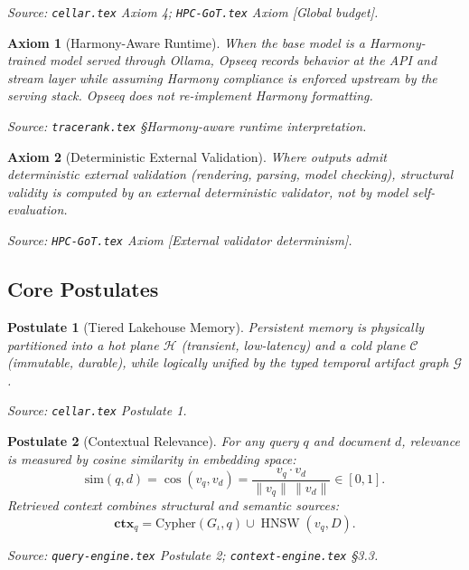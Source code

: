 \documentclass[11pt]{article}
\newtheorem{axiom}{Axiom}
\newtheorem{postulate}{Postulate}
\theoremstyle{remark}
\DeclareMathOperator{\HNSW}{HNSW}
\newcommand{\ctxq}{\mathbf{ctx}_q}
\newcommand{\graph}{\mathcal{G}}
\newcommand{\hot}{\mathcal{H}}
\newcommand{\cold}{\mathcal{C}}
\begin{document}
\noindent\textit{Source: \texttt{cellar.tex} Axiom 4; \texttt{HPC-GoT.tex} Axiom [Global budget].}

\begin{axiom}[Harmony-Aware Runtime]
\label{ax:harmony}
When the base model is a Harmony-trained model served through Ollama, Opseeq records behavior at the API and stream layer while assuming Harmony compliance is enforced upstream by the serving stack. Opseeq does not re-implement Harmony formatting.
\end{axiom}

\noindent\textit{Source: \texttt{tracerank.tex} \S Harmony-aware runtime interpretation.}

\begin{axiom}[Deterministic External Validation]
\label{ax:validation}
Where outputs admit deterministic external validation (rendering, parsing, model checking), structural validity is computed by an external deterministic validator, not by model self-evaluation.
\end{axiom}

\noindent\textit{Source: \texttt{HPC-GoT.tex} Axiom [External validator determinism].}

\subsection{Core Postulates}
\label{subsec:postulates}

\begin{postulate}[Tiered Lakehouse Memory]
\label{post:lakehouse}
Persistent memory is physically partitioned into a hot plane $\hot$ (transient, low-latency) and a cold plane $\cold$ (immutable, durable), while logically unified by the typed temporal artifact graph $\graph$.
\end{postulate}

\noindent\textit{Source: \texttt{cellar.tex} Postulate 1.}

\begin{postulate}[Contextual Relevance]
\label{post:relevance}
For any query $q$ and document $d$, relevance is measured by cosine similarity in embedding space:
\[
\mathrm{sim}(q, d) = \cos(v_q, v_d) = \frac{v_q \cdot v_d}{\|v_q\|\,\|v_d\|} \in [0, 1].
\]
Retrieved context combines structural and semantic sources:
\[
\ctxq = \mathrm{Cypher}(G_\iota, q) \cup \HNSW(v_q, D).
\]
\end{postulate}

\noindent\textit{Source: \texttt{query-engine.tex} Postulate 2; \texttt{context-engine.tex} \S3.3.}
\end{document}
